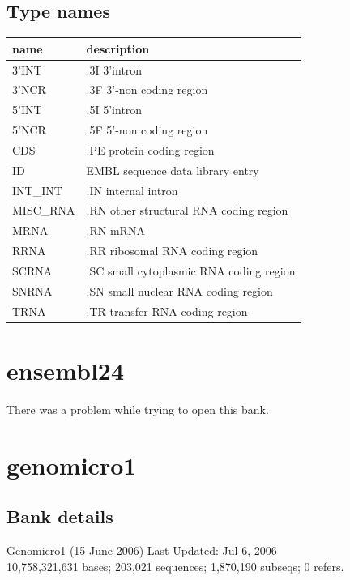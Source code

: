 \documentclass{article}
\begin{document}
\begin{Schunk}
\subsection{Type names}
\noindent\begin{tabular}{ll}
\hline \hline
name & description\\
\hline
3'INT & .3I 3'intron \\
3'NCR & .3F  3'-non coding region \\
5'INT & .5I 5'intron \\
5'NCR & .5F  5'-non coding region \\
CDS & .PE protein coding region \\
ID & EMBL sequence data library entry \\
INT\_INT & .IN  internal intron \\
MISC\_RNA & .RN other structural RNA coding region \\
MRNA & .RN mRNA \\
RRNA & .RR ribosomal RNA coding region \\
SCRNA & .SC small cytoplasmic RNA coding region \\
SNRNA & .SN small nuclear RNA coding region \\
TRNA & .TR transfer RNA coding region \\
\hline \hline
\end{tabular}

\section{ ensembl24 }
There was a problem while trying to open this bank.
\section{ genomicro1 }
\subsection{Bank details}
Genomicro1 (15 June 2006) Last Updated: Jul  6, 2006\\
10,758,321,631 bases; 203,021 sequences; 1,870,190 subseqs; 0 refers.\\
\\
\\



\end{Schunk}
\end{document}

